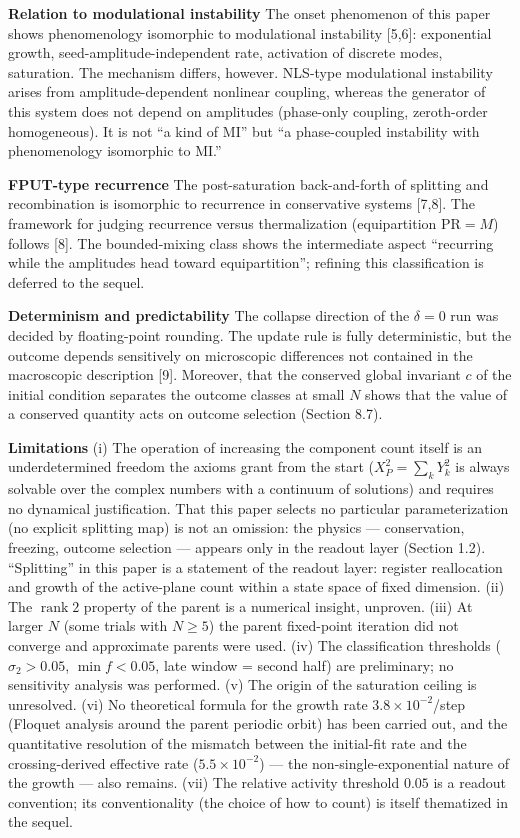 \documentclass[
  a4paper,
]{article}
\begin{document}
\textbf{Relation to modulational instability} The onset phenomenon of
this paper shows phenomenology isomorphic to modulational instability
{[}5,6{]}: exponential growth, seed-amplitude-independent rate,
activation of discrete modes, saturation. The mechanism differs,
however. NLS-type modulational instability arises from
amplitude-dependent nonlinear coupling, whereas the generator of this
system does not depend on amplitudes (phase-only coupling, zeroth-order
homogeneous). It is not ``a kind of MI'' but ``a phase-coupled
instability with phenomenology isomorphic to MI.''

\textbf{FPUT-type recurrence} The post-saturation back-and-forth of
splitting and recombination is isomorphic to recurrence in conservative
systems {[}7,8{]}. The framework for judging recurrence versus
thermalization (equipartition \(\mathrm{PR}=M\)) follows {[}8{]}. The
bounded-mixing class shows the intermediate aspect ``recurring while the
amplitudes head toward equipartition''; refining this classification is
deferred to the sequel.

\textbf{Determinism and predictability} The collapse direction of the
\(\delta=0\) run was decided by floating-point rounding. The update rule
is fully deterministic, but the outcome depends sensitively on
microscopic differences not contained in the macroscopic description
{[}9{]}. Moreover, that the conserved global invariant \(c\) of the
initial condition separates the outcome classes at small \(N\) shows
that the value of a conserved quantity acts on outcome selection
(Section 8.7).

\textbf{Limitations} (i) The operation of increasing the component count
itself is an underdetermined freedom the axioms grant from the start
(\(X_P^2=\sum_kY_k^2\) is always solvable over the complex numbers with
a continuum of solutions) and requires no dynamical justification. That
this paper selects no particular parameterization (no explicit splitting
map) is not an omission: the physics --- conservation, freezing, outcome
selection --- appears only in the readout layer (Section 1.2).
``Splitting'' in this paper is a statement of the readout layer:
register reallocation and growth of the active-plane count within a
state space of fixed dimension. (ii) The \(\operatorname{rank}2\)
property of the parent is a numerical insight, unproven. (iii) At larger
\(N\) (some trials with \(N\ge5\)) the parent fixed-point iteration did
not converge and approximate parents were used. (iv) The classification
thresholds (\(\sigma_2>0.05\), \(\min f<0.05\), late window = second
half) are preliminary; no sensitivity analysis was performed. (v) The
origin of the saturation ceiling is unresolved. (vi) No theoretical
formula for the growth rate \(3.8\times10^{-2}\)/step (Floquet analysis
around the parent periodic orbit) has been carried out, and the
quantitative resolution of the mismatch between the initial-fit rate and
the crossing-derived effective rate (\(5.5\times10^{-2}\)) --- the
non-single-exponential nature of the growth --- also remains. (vii) The
relative activity threshold \(0.05\) is a readout convention; its
conventionality (the choice of how to count) is itself thematized in the
sequel.
\end{document}
